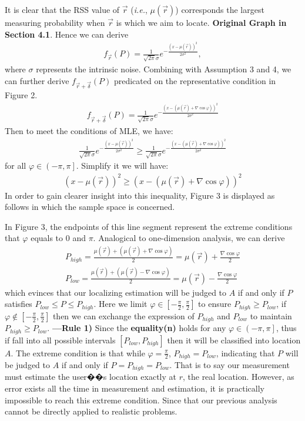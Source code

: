 \documentclass[10pt,conference,compsocconf,letterpaper]{IEEEtran}
\newcommand{\ie}{{\em i.e.}}
\begin{document}
It is clear that the RSS value of $\vec r$ (\ie, $\mu (\vec r)$) corresponds the largest measuring probability when $\vec r$ is which we aim to locate. \textbf{Original Graph in Section 4.1}. Hence we can derive
\begin{align}
{f_{\vec r}}(P) = \frac{1}{{\sqrt {2\pi } \sigma }}{e^{ - \frac{{{{(x - \mu (\vec r))}^2}}}{{2{\sigma ^2}}}}},
\end{align}
where $\sigma$ represents the intrinsic noise. Combining with Assumption 3 and 4, we can further derive ${f_{\vec r + \vec \delta }}(P)$ predicated on the representative condition in Figure 2.
\begin{align}
{f_{\vec r + \vec \delta }}(P) = \frac{1}{{\sqrt {2\pi } \sigma }}{e^{ - \frac{{{{(x - (\mu (\vec r) + \nabla \cos \varphi ))}^2}}}{{2{\sigma ^2}}}}}
\end{align}
Then to meet the conditions of MLE, we have:
\begin{align}
\frac{1}{{\sqrt {2\pi } \sigma }}{e^{ - \frac{{{{(x - \mu (\vec r))}^2}}}{{2{\sigma ^2}}}}} \ge \frac{1}{{\sqrt {2\pi } \sigma }}{e^{ - \frac{{{{(x - (\mu (\vec r) + \nabla \cos \varphi ))}^2}}}{{2{\sigma ^2}}}}}
\end{align}
for all $\varphi  \in \left( { - \pi ,\pi } \right]$. Simplify it we will have:
\begin{align}
{(x - \mu (\vec r))^2} \ge {(x - (\mu (\vec r) + \nabla \cos \varphi ))^2}
\end{align}
In order to gain clearer insight into this inequality, Figure 3 is displayed as follows in which the sample space is concerned.

In Figure 3, the endpoints of this line segment represent the extreme conditions that $\varphi$ equals to 0 and $\pi$. Analogical to one-dimension analysis, we can derive
\begin{align}
{P_{high}} = \frac{{\mu (\vec r) + (\mu (\vec r) + \nabla \cos \varphi )}}{2} = \mu (\vec r) + \frac{{\nabla \cos \varphi }}{2}\\
{P_{low}} = \frac{{\mu (\vec r) + (\mu (\vec r) - \nabla \cos \varphi )}}{2} = \mu (\vec r) - \frac{{\nabla \cos \varphi }}{2}
\end{align}
which evinces that our localizing estimation will be judged to $A$ if and only if $P$ satisfies ${P_{low}} \le P \le {P_{high}}$. Here we limit $\varphi  \in [ - \frac{\pi }{2},\frac{\pi }{2}]$ to ensure ${P_{high}} \ge {P_{low}}$, if $\varphi  \notin [ - \frac{\pi }{2},\frac{\pi }{2}]$ then we can exchange the expression of ${P_{high}}$ and ${P_{low}}$ to maintain ${P_{high}} \ge {P_{low}}$. \textbf{---Rule 1)} Since the \textbf{equality(n)} holds for any $\varphi  \in \left( { - \pi ,\pi } \right]$, thus if fall into all possible intervals $[{P_{low}},{P_{high}}]$ then it will be classified into location $A$. The extreme condition is that while $\varphi  = \frac{\pi }{2}$, ${P_{high}} = {P_{low}}$, indicating that $P$ will be judged to $A$ if and only if $P = {P_{high}} = {P_{low}}$. That is to say our measurement must estimate the user��s location exactly at $r$, the real location. However, as error exists all the time in measurement and estimation, it is practically impossible to reach this extreme condition. Since that our previous analysis cannot be directly applied to realistic problems.
\end{document}
